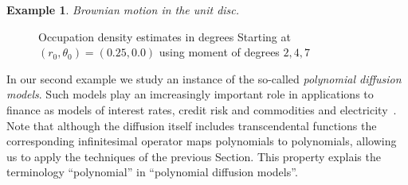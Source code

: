 \documentclass[12pt]{amsart}
\theoremstyle{definition}
\newtheorem{examplex}[lemma]{Example}
\begin{document}
\begin{examplex} {\it Brownian motion in the unit disc.}
\begin{figure}
    \centering
    \caption{Occupation density estimates in degrees Starting at $(r_0,\theta_0)=(0.25,0.0)$ using moment of degrees $2,4,7$}
    \label{fig: Brownian_Occupation}
\end{figure}


\end{examplex}

In our second example we study an instance of the so-called {\it polynomial diffusion models}. Such models play an imcreasingly important role in applications to finance as models of interest rates, credit risk and commodities and electricity~\cite{FilipovicLarsson}. Note that although the diffusion itself includes transcendental functions the corresponding infinitesimal operator maps polynomials to polynomials, allowing us to apply the techniques of the previous Section. This property explais the terminology ``polynomial'' in ``polynomial diffusion models''.
\end{document}
